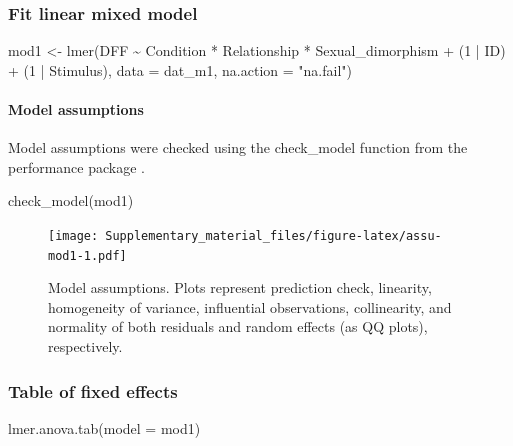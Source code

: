 \documentclass[
  bookmarksnumbered]{article}
\newenvironment{Shaded}{\begin{snugshade}}{\end{snugshade}}
\newcommand{\AttributeTok}[1]{\textcolor[rgb]{0.80,0.80,0.80}{#1}}
\newcommand{\DecValTok}[1]{\textcolor[rgb]{0.86,0.86,0.80}{#1}}
\newcommand{\FunctionTok}[1]{\textcolor[rgb]{0.94,0.94,0.56}{#1}}
\newcommand{\NormalTok}[1]{\textcolor[rgb]{0.80,0.80,0.80}{#1}}
\newcommand{\OtherTok}[1]{\textcolor[rgb]{0.94,0.94,0.56}{#1}}
\newcommand{\SpecialCharTok}[1]{\textcolor[rgb]{0.86,0.64,0.64}{#1}}
\newcommand{\StringTok}[1]{\textcolor[rgb]{0.80,0.58,0.58}{#1}}
\begin{document}
\subsubsection{Fit linear mixed model}\label{fit-linear-mixed-model}

\begin{Shaded}
\begin{Highlighting}[]
\NormalTok{mod1 }\OtherTok{\textless{}{-}} \FunctionTok{lmer}\NormalTok{(DFF }\SpecialCharTok{\textasciitilde{}}\NormalTok{ Condition }\SpecialCharTok{*}\NormalTok{ Relationship }\SpecialCharTok{*}\NormalTok{ Sexual\_dimorphism }\SpecialCharTok{+}
\NormalTok{               (}\DecValTok{1} \SpecialCharTok{|}\NormalTok{ ID) }\SpecialCharTok{+}\NormalTok{ (}\DecValTok{1} \SpecialCharTok{|}\NormalTok{ Stimulus), }
             \AttributeTok{data =}\NormalTok{ dat\_m1,}
             \AttributeTok{na.action =} \StringTok{"na.fail"}\NormalTok{)}
\end{Highlighting}
\end{Shaded}

\paragraph{Model assumptions}\label{model-assumptions}

Model assumptions were checked using the check\_model function from the performance package \autocite{ludecke2021}.

\begin{Shaded}
\begin{Highlighting}[]
\FunctionTok{check\_model}\NormalTok{(mod1)}
\end{Highlighting}
\end{Shaded}

\begin{figure}
\centering
\texttt{[image: Supplementary\_material\_files/figure-latex/assu-mod1-1.pdf]}
\caption{\label{fig:assu-mod1}Model assumptions. Plots represent prediction check, linearity, homogeneity of variance, influential observations, collinearity, and normality of both residuals and random effects (as QQ plots), respectively.}
\end{figure}

\subsubsection{Table of fixed effects}\label{table-of-fixed-effects}

\begin{Shaded}
\begin{Highlighting}[]
\FunctionTok{lmer.anova.tab}\NormalTok{(}\AttributeTok{model =}\NormalTok{ mod1)}
\end{Highlighting}
\end{Shaded}
\end{document}
